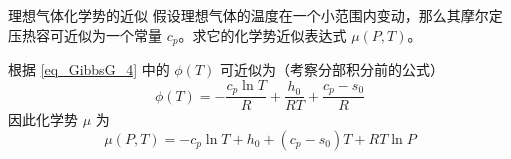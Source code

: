 \begin{example}{理想气体化学势的近似}
假设理想气体的温度在一个小范围内变动，那么其摩尔定压热容可近似为一个常量 $c_p$。求它的化学势近似表达式 $\mu(P,T)$。

根据 \autoref{eq_GibbsG_4} 中的 $\phi(T)$ 可近似为（考察分部积分前的公式）
\begin{equation}
\phi(T)=-\frac{c_p\ln T}{R}+\frac{h_0}{RT}+\frac{c_p-s_0}{R}
\end{equation}
因此化学势 $\mu$ 为
\begin{equation}\label{eq_GibbsG_5}
\mu(P,T)=-c_p\ln T+h_0+(c_p-s_0)T+RT\ln P
\end{equation}

\end{example}
